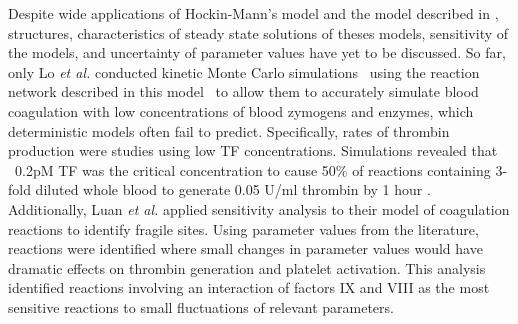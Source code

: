 Despite wide applications of Hockin-Mann's model
\cite{HocJon02} and the model described in \cite{JonMan94a,JonMan94b}, structures, characteristics of steady state
solutions of theses models, sensitivity of the models, and uncertainty of
parameter values have
yet to be discussed. %
 So far,  only Lo \emph{et al.} conducted kinetic Monte Carlo
simulations~\cite{LoDen05} using the reaction network described in
this model~\cite{HocJon02} to allow them to accurately simulate
blood coagulation with low concentrations of blood zymogens and
enzymes, which deterministic models often fail to predict.
 Specifically, rates of thrombin production were studies using low TF
concentrations. Simulations revealed that ~0.2pM TF was the critical
concentration to cause 50\% of reactions containing 3-fold diluted
whole blood to generate 0.05 U/ml thrombin by 1 hour \cite{LoDen05}.
Additionally, Luan \emph{et al.} \cite{LZV}  applied sensitivity analysis to their model of  coagulation reactions to identify fragile sites. Using parameter
values from the literature, reactions were identified where small
changes in parameter values would have dramatic effects on thrombin
generation and platelet activation. This analysis \cite{LZV}
 identified reactions involving an interaction of factors IX and VIII
as the most sensitive reactions to small fluctuations of relevant
parameters.

 

